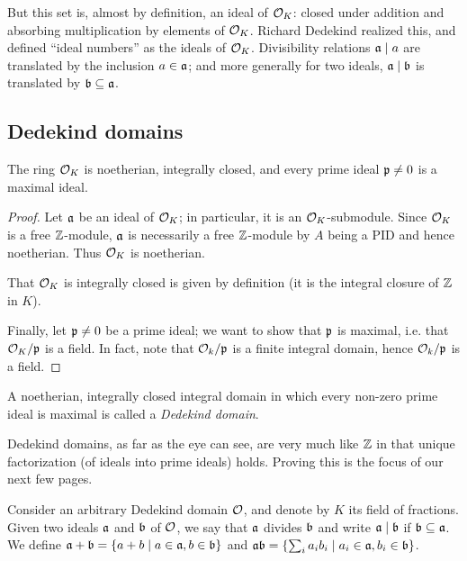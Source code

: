 But this set is, almost by definition, an ideal of $\mathcal{O}_K$: closed under addition and absorbing multiplication by elements of $\mathcal{O}_K$. Richard Dedekind realized this, and defined ``ideal numbers'' as the ideals of $\mathcal{O}_K$. Divisibility relations $\mathfrak{a}\mid a$ are translated by the inclusion $a\in\mathfrak{a}$; and more generally for two ideals, $\mathfrak{a}\mid\mathfrak{b}$ is translated by $\mathfrak{b}\subseteq\mathfrak{a}$.

\subsection{Dedekind domains}


\begin{thm}
	The ring $\mathcal{O}_K$ is noetherian, integrally closed, and every prime ideal $\mathfrak{p}\neq 0$ is a maximal ideal.
\end{thm}
\begin{proof}
	Let $\mathfrak{a}$ be an ideal of $\mathcal{O}_K$; in particular, it is an $\mathcal{O}_K$-submodule. Since $\mathcal{O}_K$ is a free $\mathbb{Z}$-module, $\mathfrak{a}$ is necessarily a free $\mathbb{Z}$-module by $A$ being a PID and hence noetherian. Thus $\mathcal{O}_K$ is noetherian.
	
	That $\mathcal{O}_K$ is integrally closed is given by definition (it is the integral closure of $\mathbb{Z}$ in $K$).

	Finally, let $\mathfrak{p}\neq 0$ be a prime ideal; we want to show that $\mathfrak{p}$ is maximal, i.e. that $\mathcal{O}_K/\mathfrak{p}$ is a field. In fact, note that $\mathcal{O}_k/\mathfrak{p}$ is a finite integral domain, hence $\mathcal{O}_k/\mathfrak{p}$ is a field.
\end{proof}

\begin{defn}
	A noetherian, integrally closed integral domain in which every non-zero prime ideal is maximal is called a \emph{Dedekind domain}.
\end{defn}

Dedekind domains, as far as the eye can see, are very much like $\mathbb{Z}$ in that unique factorization (of ideals into prime ideals) holds. Proving this is the focus of our next few pages.

Consider an arbitrary Dedekind domain $\mathcal{O}$, and denote by $K$ its field of fractions. Given two ideals $\mathfrak{a}$ and $\mathfrak{b}$ of $\mathcal{O}$, we say that $\mathfrak{a}$ divides $\mathfrak{b}$ and write $\mathfrak{a}\mid\mathfrak{b}$ if $\mathfrak{b}\subseteq\mathfrak{a}$. We define $\mathfrak{a}+\mathfrak{b}=\{a+b\mid a\in\mathfrak{a}, b\in\mathfrak{b}\}$ and $\mathfrak{a}\mathfrak{b} = \{\sum_i a_ib_i \mid a_i\in\mathfrak{a}, b_i\in\mathfrak{b}\}$.

